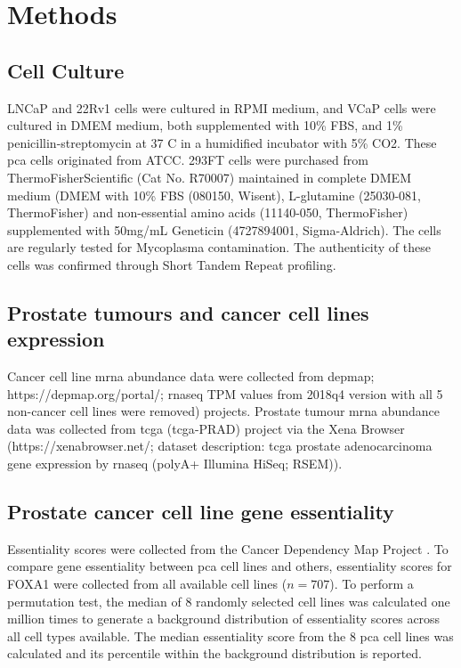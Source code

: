 \section{Methods}
\label{sec:FOXA1_methods}

\subsection{Cell Culture}

LNCaP and 22Rv1 cells were cultured in RPMI medium, and VCaP cells were cultured in DMEM medium, both supplemented with 10\% FBS, and 1\% penicillin-streptomycin at 37 \textdegree C in a humidified incubator with 5\% CO2.
These \gls{pca} cells originated from ATCC.
293FT cells were purchased from ThermoFisherScientific (Cat No. R70007) maintained in complete DMEM medium (DMEM with 10\% FBS (080150, Wisent), L-glutamine (25030-081, ThermoFisher) and non-essential amino acids (11140-050, ThermoFisher) supplemented with 50mg/mL Geneticin (4727894001, Sigma-Aldrich).
The cells are regularly tested for Mycoplasma contamination.
The authenticity of these cells was confirmed through Short Tandem Repeat profiling.

\subsection{Prostate tumours and cancer cell lines expression}

Cancer cell line \gls{mrna} abundance data were collected from \gls{depmap}; https://depmap.org/portal/; \gls{rnaseq} TPM values from 2018q4 version with all 5 non-cancer cell lines were removed) \cite{thecancercelllineencyclopediaconsortiumPharmacogenomicAgreementTwo2015} projects.
Prostate tumour \gls{mrna} abundance data was collected from \gls{tcga}  (\gls{tcga}-PRAD) project via the Xena Browser (https://xenabrowser.net/; dataset description: \gls{tcga} prostate adenocarcinoma gene expression by \gls{rnaseq} (polyA+ Illumina HiSeq; RSEM)).

\subsection{Prostate cancer cell line gene essentiality}

Essentiality scores were collected from the Cancer Dependency Map Project \cite{mcfarlandImprovedEstimationCancer2018}.
To compare gene essentiality between \gls{pca} cell lines and others, essentiality scores for FOXA1 were collected from all available cell lines ($n = 707$).
To perform a permutation test, the median of 8 randomly selected cell lines was calculated one million times to generate a background distribution of essentiality scores across all cell types available.
The median essentiality score from the 8 \gls{pca} cell lines was calculated and its percentile within the background distribution is reported.

